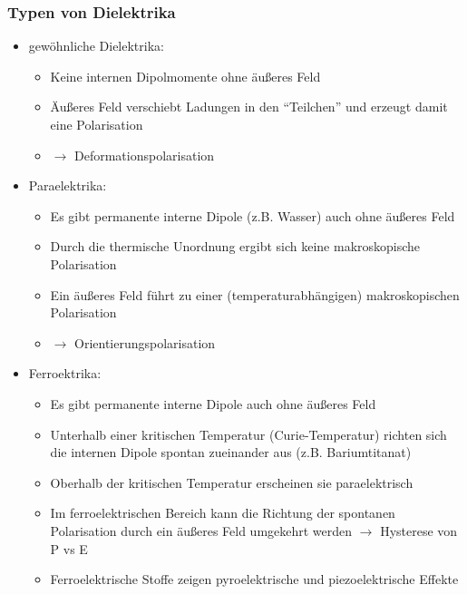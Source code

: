 \begin{frame}
\frametitle{Typen von Dielektrika}
\begin{itemize}[<+->]
\item \alert{gewöhnliche Dielektrika:}
  \begin{itemize}[<+->]
  \item Keine internen Dipolmomente ohne äußeres Feld
  \item Äußeres Feld verschiebt Ladungen in den \enquote{Teilchen} und erzeugt damit eine Polarisation
  \item $\to$ \alert{Deformationspolarisation}
  \end{itemize}
\item \alert{Paraelektrika:}
    \begin{itemize}[<+->]
    \item Es gibt permanente interne Dipole (z.B. Wasser) auch ohne äußeres Feld
    \item Durch die thermische Unordnung ergibt sich keine makroskopische Polarisation
    \item Ein äußeres Feld führt zu einer (temperaturabhängigen) makroskopischen Polarisation
      \item $\to$ \alert{Orientierungspolarisation}
      \end{itemize}
      \item \alert{Ferroektrika:}
    \begin{itemize}[<+->]
    \item Es gibt permanente interne Dipole auch ohne äußeres Feld
    \item Unterhalb einer kritischen Temperatur (Curie-Temperatur) richten sich die internen Dipole \alert{spontan} zueinander aus (z.B. Bariumtitanat)
    \item Oberhalb der kritischen Temperatur erscheinen sie paraelektrisch
    \item Im ferroelektrischen Bereich kann die Richtung der spontanen Polarisation durch ein äußeres Feld umgekehrt werden $\to$ \alert{Hysterese} von P vs E
      \item Ferroelektrische Stoffe zeigen \alert{pyroelektrische} und \alert{piezoelektrische} Effekte   
      \end{itemize}
\end{itemize}
\end{frame}

